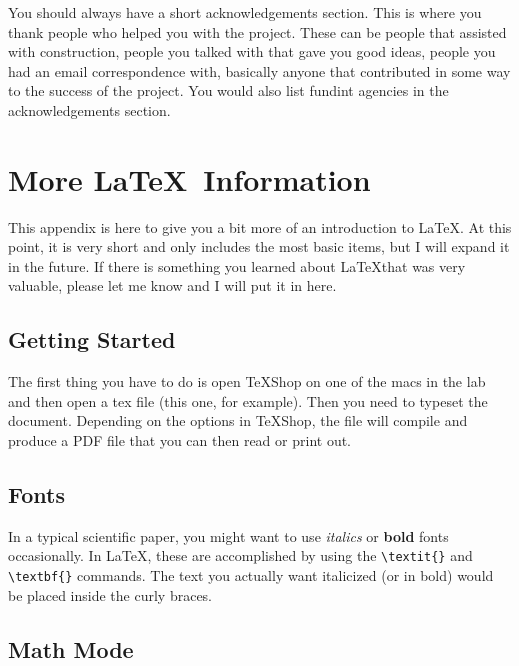 \documentclass[preprint,pre,floats,aps,amsmath,amssymb]{revtex4}
\begin{document}
\begin{acknowledgments}

You should always have a short acknowledgements section.  This is
where you thank people who helped you with the project.  These can be
people that assisted with construction, people you talked with that
gave you good ideas, people you had an email correspondence with,
basically anyone that contributed in some way to the success of the
project.  You would also list fundint agencies in the acknowledgements
section.

\end{acknowledgments}


\appendix*

\section{More \LaTeX\ Information}
\label{sec:latex}

This appendix is here to give you a bit more of an introduction to
\LaTeX.  At this point, it is very short and only includes the most
basic items, but I will expand it in the future.  If there is
something you learned about \LaTeX that was very valuable, please let
me know and I will put it in here.

\subsection{Getting Started}

The first thing you have to do is open TeXShop on one of the macs in
the lab and then open a tex file (this one, for example).  Then you
need to typeset the document.  Depending on the options in TeXShop,
the file will compile and produce a PDF file that you can then read or
print out.

\subsection{Fonts}

In a typical scientific paper, you might want to use \textit{italics}
or \textbf{bold} fonts occasionally.  In \LaTeX, these are
accomplished by using the \verb!\textit{}! and \verb!\textbf{}!
commands.  The text you actually want italicized (or in bold) would be
placed inside the curly braces.

\subsection{Math Mode}
\end{document}
